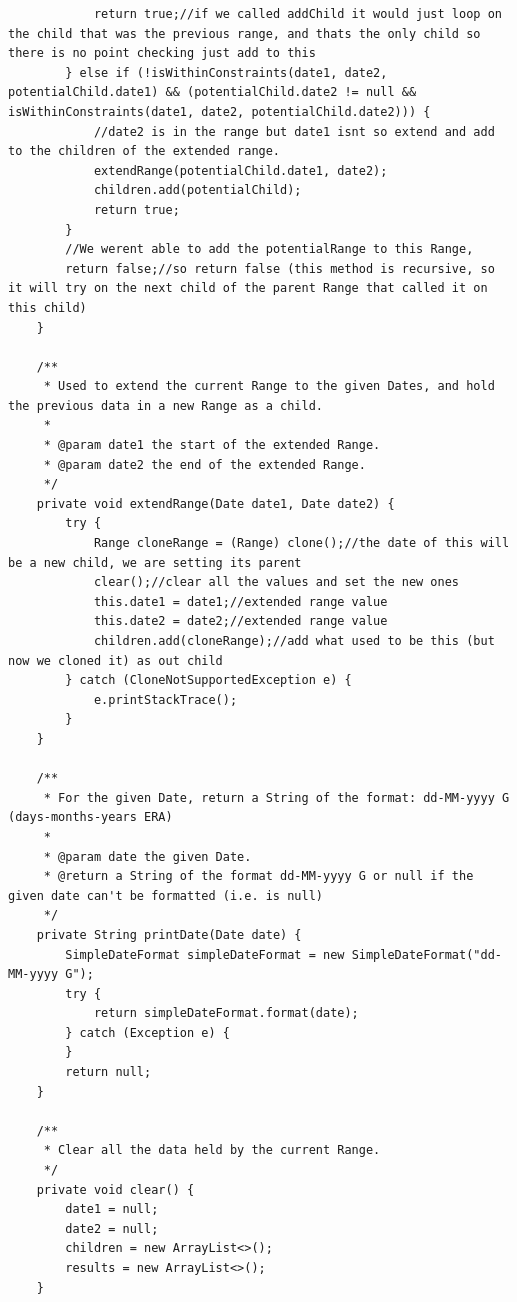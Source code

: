 \begin{lstlisting}
            return true;//if we called addChild it would just loop on the child that was the previous range, and thats the only child so there is no point checking just add to this
        } else if (!isWithinConstraints(date1, date2, potentialChild.date1) && (potentialChild.date2 != null && isWithinConstraints(date1, date2, potentialChild.date2))) {
            //date2 is in the range but date1 isnt so extend and add to the children of the extended range.
            extendRange(potentialChild.date1, date2);
            children.add(potentialChild);
            return true;
        }
        //We werent able to add the potentialRange to this Range,
        return false;//so return false (this method is recursive, so it will try on the next child of the parent Range that called it on this child)
    }

    /**
     * Used to extend the current Range to the given Dates, and hold the previous data in a new Range as a child.
     *
     * @param date1 the start of the extended Range.
     * @param date2 the end of the extended Range.
     */
    private void extendRange(Date date1, Date date2) {
        try {
            Range cloneRange = (Range) clone();//the date of this will be a new child, we are setting its parent
            clear();//clear all the values and set the new ones
            this.date1 = date1;//extended range value
            this.date2 = date2;//extended range value
            children.add(cloneRange);//add what used to be this (but now we cloned it) as out child
        } catch (CloneNotSupportedException e) {
            e.printStackTrace();
        }
    }

    /**
     * For the given Date, return a String of the format: dd-MM-yyyy G (days-months-years ERA)
     *
     * @param date the given Date.
     * @return a String of the format dd-MM-yyyy G or null if the given date can't be formatted (i.e. is null)
     */
    private String printDate(Date date) {
        SimpleDateFormat simpleDateFormat = new SimpleDateFormat("dd-MM-yyyy G");
        try {
            return simpleDateFormat.format(date);
        } catch (Exception e) {
        }
        return null;
    }

    /**
     * Clear all the data held by the current Range.
     */
    private void clear() {
        date1 = null;
        date2 = null;
        children = new ArrayList<>();
        results = new ArrayList<>();
    }


\end{lstlisting}
